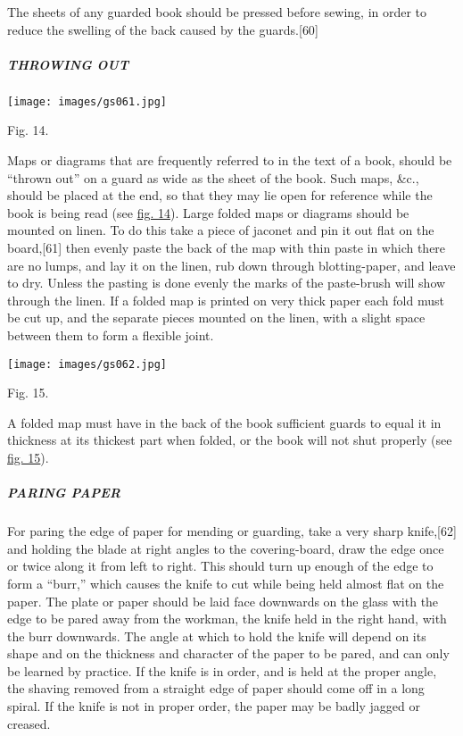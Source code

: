 \documentclass[
]{article}
\begin{document}
The sheets of any guarded book should be pressed before sewing, in order
to reduce the swelling of the back caused by the
guards.{\protect\hypertarget{Page_60}{}{{[}60{]}}}

\hypertarget{throwing-out}{%
\subparagraph{THROWING OUT}\label{throwing-out}}

\protect\hypertarget{Fig_14}{}{}
\texttt{[image: images/gs061.jpg]}

Fig. 14.

Maps or diagrams that are frequently referred to in the text of a book,
should be ``thrown out'' on a guard as wide as the sheet of the book.
Such maps, \&c., should be placed at the end, so that they may lie open
for reference while the book is being read (see
\protect\hyperlink{Fig_14}{fig. 14}). Large folded maps or diagrams
should be mounted on linen. To do this take a piece of jaconet and pin
it out flat on the board,{\protect\hypertarget{Page_61}{}{{[}61{]}}}
then evenly paste the back of the map with thin paste in which there are
no lumps, and lay it on the linen, rub down through blotting-paper, and
leave to dry. Unless the pasting is done evenly the marks of the
paste-brush will show through the linen. If a folded map is printed on
very thick paper each fold must be cut up, and the separate pieces
mounted on the linen, with a slight space between them to form a
flexible joint.

\protect\hypertarget{Fig_15}{}{}
\texttt{[image: images/gs062.jpg]}

Fig. 15.

A folded map must have in the back of the book sufficient guards to
equal it in thickness at its thickest part when folded, or the book will
not shut properly (see \protect\hyperlink{Fig_15}{fig. 15}).

\hypertarget{paring-paper}{%
\subparagraph{PARING PAPER}\label{paring-paper}}

For paring the edge of paper for mending or guarding, take a very sharp
knife,{\protect\hypertarget{Page_62}{}{{[}62{]}}} and holding the blade
at right angles to the covering-board, draw the edge once or twice along
it from left to right. This should turn up enough of the edge to form a
``burr,'' which causes the knife to cut while being held almost flat on
the paper. The plate or paper should be laid face downwards on the glass
with the edge to be pared away from the workman, the knife held in the
right hand, with the burr downwards. The angle at which to hold the
knife will depend on its shape and on the thickness and character of the
paper to be pared, and can only be learned by practice. If the knife is
in order, and is held at the proper angle, the shaving removed from a
straight edge of paper should come off in a long spiral. If the knife is
not in proper order, the paper may be badly jagged or creased.
\end{document}
